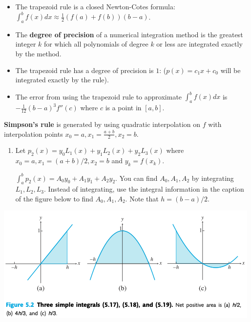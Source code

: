 \documentclass[12pt,letterpaper,noanswers]{exam}
\begin{document}
\begin{tcolorbox}
\begin{itemize}
\itemsep0pt
    \item The trapezoid rule is a closed Newton-Cotes formula: $\int_a^b f(x)dx \approx \frac{1}{2}(f(a)+f(b))(b-a)$.  
    \item The {\bf degree of precision} of a numerical integration method is the greatest integer $k$ for which all polynomials of degree $k$ or less are integrated exactly by the method.

    \end{itemize}
    \end{tcolorbox}
    \begin{tcolorbox}
    \begin{itemize}
    \itemsep0pt
        \item The trapezoid rule has a degree of precision is $1$: ($p(x) = c_1 x + c_0$ will be integrated exactly by the rule).
    \item The error from using the trapezoid rule to approximate $\int_a^b f(x)dx$ is $-\frac{1}{12}(b-a)^3f''(c)$ where $c$ is a point in $[a,b]$.
\end{itemize}
\end{tcolorbox}






\begin{tcolorbox}
\textbf{Simpson's rule} is generated by using quadratic interpolation on $f$ with interpolation points $x_0 = a, x_1 = \frac{a+b}{2}, x_2 = b$.
\end{tcolorbox}
\begin{enumerate}[resume=classQ]
    \item Let $p_2(x) = y_0L_1(x) + y_1L_2(x)+y_2L_3(x)$ where $x_0 = a, x_1 = (a+b)/2, x_2 = b$ and $y_k = f(x_k)$.  
    
    $\displaystyle\int_a^b p_2(x) = A_0 y_0 + A_1 y_1 + A_2 y_2$.  You can find $A_0, A_1, A_2$ by integrating $L_1, L_2, L_3$.  Instead of integrating, use the integral information in the caption of the figure below to find $A_0, A_1, A_2$.  Note that $h = (b-a)/2$.
\end{enumerate}


    \includegraphics{img/Class12Sauerintegrals.png}
    
\end{document}
